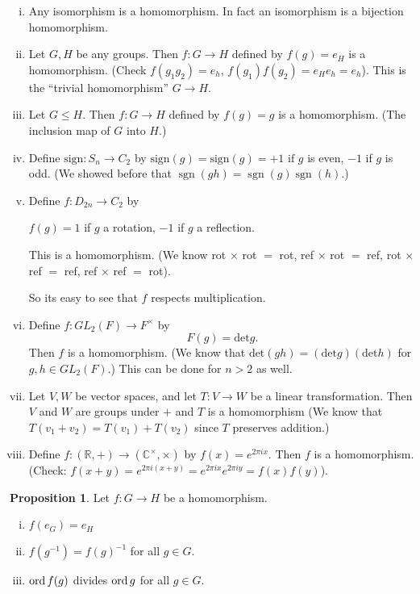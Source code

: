 \documentclass{article}
\theoremstyle{definition} \newtheorem*{definition}{Definition}
\newtheorem{proposition}[theorem]{Proposition}
\DeclareMathOperator{\sgn}{sgn} \DeclareMathOperator{\id}{id}
\begin{document}
\begin{exmps}\hfill \begin{enumerate}[(i)] \item Any isomorphism is a homomorphism.
        In fact an isomorphism is a bijection homomorphism.  \item Let $G,H$ be
          any groups. Then $f : G \rightarrow H$ defined by $f(g) = e_H$ is a
          homomorphism. (Check $f(g_1 g_2)=e_h$, $f(g_1)f(g_2)=e_He_h = e_h$).
          This is the ``trivial homomorphism'' $G \rightarrow H.$ \item Let $G
          \leq H$. Then $f:G\rightarrow H$ defined by $f(g)=g$ is a
        homomorphism. (The inclusion map of $G$ into $H$.) \item Define
          $\text{sign}:S_n \rightarrow C_2$ by
          $\text{sign}(g)=\text{sign}(g)=+1 \text{ if } g $ is even, $-1$ if
          $g$ is odd. (We showed before that $\sgn(gh)=\sgn(g)\sgn(h)$.) \item
            Define $f:D_{2n} \rightarrow C_2$ by 

    $f(g)=1$ if $g$ a rotation, $-1$ if $g$ a reflection.

    This is a homomorphism. (We know rot $\times$ rot $=$ rot, ref $\times$ rot
    $=$ ref, rot $\times$ ref $=$ ref, ref $\times$ ref $=$ rot).

    So its easy to see that $f$ respects multiplication.

  \item Define $f:GL_2(F) \rightarrow F^\times$ by $$F(g) = \text{det}g.$$ Then
  $f$ is a homomorphism.  (We know that
$\text{det}(gh)=(\text{det}g)(\text{det}h)$ for $g,h \in GL_2(F)$.) This can be
done for $n>2$ as well.  \item Let $V,W$ be vector spaces, and let $T:V
  \rightarrow W$ be a linear transformation. Then $V$ and $W$ are groups under
  $+$ and $T$ is a homomorphism (We know that $T(v_1 + v_2)=T(v_1)+T(v_2)$
  since $T$ preserves addition.) \item Define $f: (\mathbb{R},+)\rightarrow
    (\mathbb{C}^\times,\times)$ by $f(x)=e^{2 \pi i x}.$ Then $f$ is a
    homomorphism. (Check: $f(x+y)=e^{2\pi i (x+y)}=e^{2\pi i x}e^{2 \pi i
    y}=f(x)f(y)$).\\ \end{enumerate}
  
\end{exmps}


\begin{proposition} Let $f: G \rightarrow H$ be a homomorphism.
\begin{enumerate}[(i)] \item $f(e_G)=e_H$ \item $f(g^{-1})=f(g)^{-1}$ for all $g \in
    G$.  \item $\operatorname{\text{ord}} f(g)$ divides $\operatorname{\text{ord}} g$ for all $g \in G$.  \end{enumerate}
\end{proposition}
\end{document}
